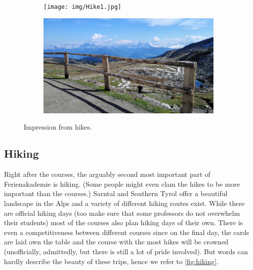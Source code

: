 \begin{figure}[ht]%
	\centering
    \begin{subfigure}[t]{0.5\textwidth}
 	\begin{center}%
 		\texttt{[image: img/Hike1.jpg]}%
 	\end{center}%
    \end{subfigure}%
    \begin{subfigure}[t]{0.5\textwidth}
 	\begin{center}%
 		\includegraphics[scale=0.05]{img/Hike2.jpg}%
 	\end{center}%
    \end{subfigure}
    \caption{Impression from hikes.}
    \label{fig:hiking}
\end{figure}
\subsection{Hiking}
Right after the courses, the arguably second most important part of Ferienakademie is hiking. (Some people might even clam the hikes to be more important than the courses.) Sarntal and Southern Tyrol offer a beautiful landscape in the Alps and a variety of different hiking routes exist. While there are official hiking days (too make sure that some professors do not overwhelm their students) most of the courses also plan hiking days of their own. There is even a competitiveness between different courses since on the final day, the cards are laid own the table and the course with the most hikes will be crowned (unofficially, admittedly, but there is still a lot of pride involved). But words can hardly describe the beauty of these trips, hence we refer to \autoref{fig:hiking}.

